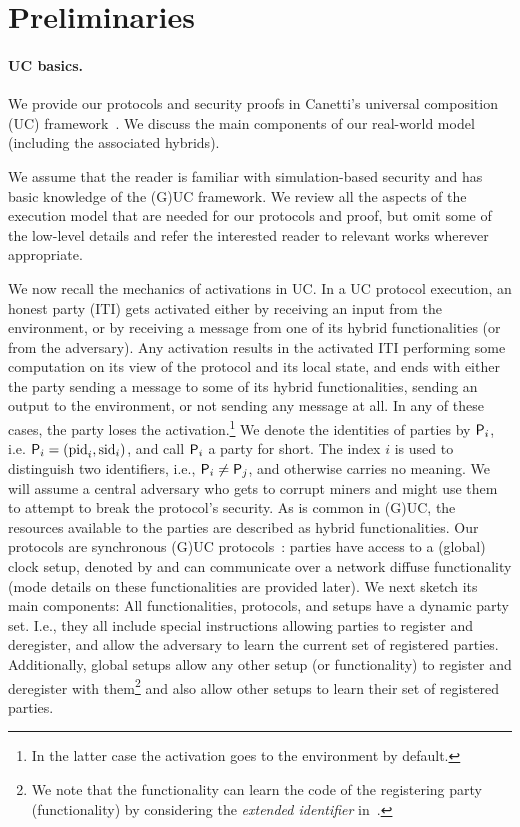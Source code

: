 \section{Preliminaries}
\label{sec:preliminaries}

\paragraph{UC basics.}
%
We provide our protocols and security proofs in Canetti's universal composition (UC) framework~\cite{JC:Canetti00}. 
%
We discuss the main components of our real-world model (including the associated hybrids).

We assume that the reader is familiar with simulation-based security and has basic knowledge of the (G)UC framework.
%
We review all the aspects of the execution model that are needed for our protocols and proof, but omit some of the low-level details and refer the interested reader to relevant works wherever appropriate.  

We now recall the mechanics of activations in UC.
%
In a UC protocol execution, an honest party (ITI)  gets activated either by receiving an input from the environment, or by receiving a message from one of its hybrid functionalities (or from the adversary).
%
Any activation results in the activated ITI performing some computation on its view of the protocol and its local state, and ends with either the party sending a message to some of its hybrid functionalities, sending an output to the environment, or not sending any message at all.
%
In any of these cases, the party loses the activation.\footnote{In the latter
case the activation goes to the environment by default.}
%
We denote the identities of parties by $\mathsf{P}_i$, i.e. $\mathsf{P}_i = (\mathrm{pid}_i,\mathrm{sid}_i)$, and call $\mathsf{P}_i$ a party for short.
%
The index $i$ is used to distinguish two identifiers, i.e., $\mathsf{P}_i \neq \mathsf{P}_j$, and otherwise carries no meaning.
%
We will assume a central adversary \adv who gets to corrupt miners and might use them to attempt to break the protocol's security.
%
As is common in (G)UC, the resources available to the parties are described as hybrid functionalities.
%
Our protocols are synchronous (G)UC protocols~\cite{C:BMTZ17}: parties have access to a (global) clock setup, denoted by \funcClock and can communicate over a network diffuse functionality \funcDiffuse (mode details on these functionalities are provided later).
%
We next sketch its main components:
%
All functionalities, protocols, and setups have a dynamic party set.
%
I.e., they all include special instructions allowing parties to register and deregister, and allow the adversary to learn the current set of registered parties.
%
Additionally,  global setups allow any other setup (or functionality) to
register and deregister with them\footnote{We note that the functionality can learn the code of the registering party (functionality) by considering the \emph{extended identifier} in~\cite{TCC:BCHTZ20}.} and also allow other setups to learn their set of registered parties.

